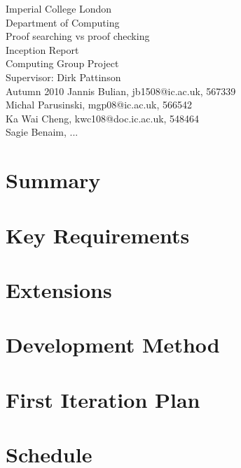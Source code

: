 \documentclass[12pt,a4paper]{scrartcl}
\begin{document}
\thispagestyle{empty}
\begin{titlepage}
  \begin{center}
    \vspace*{\fill}
            {{\Large Imperial College London\\ Department of Computing\\}}
            \vfill {{\Huge Proof searching vs proof checking \\
                     Inception Report}}\\
            \vfill {{\large Computing Group Project\\ 
                Supervisor: Dirk Pattinson\\ Autumn 2010}}
            \vfill {Jannis Bulian, jb1508@ic.ac.uk, 567339 \\
                    Michal Parusinski, mgp08@ic.ac.uk, 566542 \\
                    Ka Wai Cheng, kwc108@doc.ic.ac.uk, 548464\\
                    Sagie Benaim, ...}
  \end{center}
\end{titlepage}

\newpage

\tableofcontents
\thispagestyle{empty}

\newpage

\section{Summary}


\section{Key Requirements}


\section{Extensions}


\section{Development Method}


\section{First Iteration Plan}


\section{Schedule}

\end{document}
